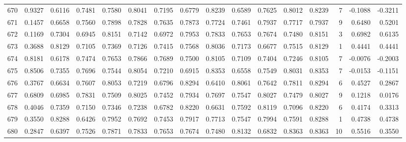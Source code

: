 \begin{tabular}{lrrrrrrrrrrrrrrr}
670 &      0.9327 &  0.6116 &  0.7481 &  0.7580 &  0.8041 &  0.7195 &  0.6779 &  0.8239 &  0.6589 &  0.7625 &   0.8012 &     0.8239 &      7 &                   -0.1088 &                    -0.3211 \\
671 &      0.1457 &  0.6658 &  0.7560 &  0.7898 &  0.7828 &  0.7635 &  0.7873 &  0.7724 &  0.7461 &  0.7937 &   0.7717 &     0.7937 &      9 &                    0.6480 &                     0.5201 \\
672 &      0.1169 &  0.7304 &  0.6945 &  0.8151 &  0.7142 &  0.6972 &  0.7953 &  0.7833 &  0.7653 &  0.7674 &   0.7480 &     0.8151 &      3 &                    0.6982 &                     0.6135 \\
673 &      0.3688 &  0.8129 &  0.7105 &  0.7369 &  0.7126 &  0.7415 &  0.7568 &  0.8036 &  0.7173 &  0.6677 &   0.7515 &     0.8129 &      1 &                    0.4441 &                     0.4441 \\
674 &      0.8181 &  0.6178 &  0.7474 &  0.7653 &  0.7866 &  0.7689 &  0.7500 &  0.8105 &  0.7109 &  0.7404 &   0.7246 &     0.8105 &      7 &                   -0.0076 &                    -0.2003 \\
675 &      0.8506 &  0.7355 &  0.7696 &  0.7544 &  0.8054 &  0.7210 &  0.6915 &  0.8353 &  0.6558 &  0.7549 &   0.8031 &     0.8353 &      7 &                   -0.0153 &                    -0.1151 \\
676 &      0.3767 &  0.6634 &  0.7607 &  0.8053 &  0.7219 &  0.6796 &  0.8294 &  0.6410 &  0.8061 &  0.7642 &   0.7811 &     0.8294 &      6 &                    0.4527 &                     0.2867 \\
677 &      0.6809 &  0.6985 &  0.7831 &  0.7509 &  0.8025 &  0.7452 &  0.7934 &  0.7697 &  0.7547 &  0.8027 &   0.7479 &     0.8027 &      9 &                    0.1218 &                     0.0176 \\
678 &      0.4046 &  0.7359 &  0.7150 &  0.7346 &  0.7238 &  0.6782 &  0.8220 &  0.6631 &  0.7592 &  0.8119 &   0.7096 &     0.8220 &      6 &                    0.4174 &                     0.3313 \\
679 &      0.3550 &  0.8288 &  0.6426 &  0.7952 &  0.7692 &  0.7453 &  0.7917 &  0.7713 &  0.7547 &  0.7994 &   0.7591 &     0.8288 &      1 &                    0.4738 &                     0.4738 \\
680 &      0.2847 &  0.6397 &  0.7526 &  0.7871 &  0.7833 &  0.7653 &  0.7674 &  0.7480 &  0.8132 &  0.6832 &   0.8363 &     0.8363 &     10 &                    0.5516 &                     0.3550 \\

\end{tabular}
